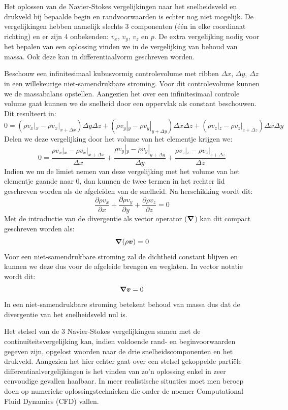 Het oplossen van de Navier-Stokes vergelijkingen naar het snelheidsveld en drukveld bij bepaalde begin en randvoorwaarden is echter nog niet mogelijk. De vergelijkingen hebben namelijk slechts 3 componenten (één in elke coordinaat richting) en er zijn 4 onbekenden: $v_x$, $v_y$, $v_z$ en $p$. De extra vergelijking nodig voor het bepalen van een oplossing vinden we in de vergelijking van behoud van massa. Ook deze kan in differentiaalvorm geschreven worden.

Beschouw een infinitesimaal kubusvormig controlevolume met ribben $\Delta x$, $\Delta y$, $\Delta z$ in een willekeurige niet-samendrukbare stroming. Voor dit controlevolume kunnen we de massabalans opstellen. Aangezien het over een infinitesimaal controle volume gaat kunnen we de snelheid door een oppervlak als constant beschouwen. Dit resulteert in:
\begin{equation}
	0 = (\rho v_x|_{x} - \rho v_x|_{x+\Delta x})\Delta y \Delta z + (\rho v_y|_{y} - \rho v_y|_{y+\Delta y})\Delta x \Delta z + (\rho v_z|_{z} - \rho v_z|_{z+\Delta z})\Delta x \Delta y
\end{equation}
Delen we deze vergelijking door het volume van het elementje krijgen we:
\begin{equation}
	0 = \frac{\rho v_x|_{x} - \rho v_x|_{x+\Delta x}}{\Delta x} + \frac{\rho v_y|_{y} - \rho v_y|_{y+\Delta y}}{\Delta y} + \frac{\rho v_z|_{z} - \rho v_z|_{z+\Delta z}}{\Delta z}
\end{equation}
Indien we nu de limiet nemen van deze vergelijking met het volume van het elementje gaande naar 0, dan kunnen de twee termen in het rechter lid geschreven worden als de afgeleiden van de snelheid. Na herschikking wordt dit:
\begin{equation}
	\frac{\partial \rho v_x}{\partial x} + \frac{\partial \rho v_y}{\partial y} + \frac{\partial \rho v_z}{\partial z} = 0
	\label{eqn:continuiteitsvergelijking}
\end{equation}
Met de introductie van de divergentie als vector operator ($\boldsymbol{\nabla}$) kan dit compact geschreven worden als:
\begin{equation}
	\boldsymbol{\nabla} (\rho\boldsymbol{v}) = 0
\end{equation}
Voor een niet-samendrukbare stroming zal de dichtheid constant blijven en kunnen we deze dus voor de afgeleide brengen en weglaten. In vector notatie wordt dit:
 \begin{equation}
	\boldsymbol{\nabla} \boldsymbol{v} = 0
\end{equation}
In een niet-samendrukbare stroming betekent behoud van massa dus dat de divergentie van het snelheidsveld nul is.

Het stelsel van de 3 Navier-Stokes vergelijkingen samen met de continuïteitsvergelijking kan, indien voldoende rand- en beginvoorwaarden gegeven zijn, opgelost woorden naar de drie snelheidscomponenten en het drukveld. Aangezien het hier echter gaat over een stelsel gekoppelde partiële differentiaalvergelijkingen is het vinden van zo'n oplossing enkel in zeer eenvoudige gevallen haalbaar. In meer realistische situaties moet men beroep doen op numerieke oplossingstechnieken die onder de noemer Computational Fluid Dynamics (CFD) vallen.